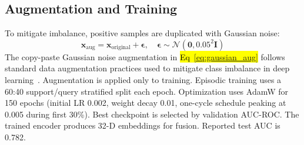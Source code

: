 \documentclass[10pt,letterpaper]{article}
\begin{document}
                                                                                                                  \subsection*{Augmentation and Training}
                                                                                                                  To mitigate imbalance, positive samples are duplicated with Gaussian noise:
                                                                                                                  \begin{equation}
                                                                                                                  \label{eq:gaussian_aug}
                                                                                                                  \mathbf{x}_{\text{aug}} = \mathbf{x}_{\text{original}} + \boldsymbol{\epsilon},\quad
                                                                                                                  \boldsymbol{\epsilon}\sim \mathcal{N}(\mathbf{0},0.05^2\mathbf{I})
                                                                                                                  \end{equation}
                                                                                                                  The copy-paste Gaussian noise augmentation in \hl{Eq~\ref{eq:gaussian_aug}} follows standard data augmentation practices used to mitigate class imbalance in deep learning~\cite{ref56}. Augmentation is applied only to training. Episodic training uses a 60:40 support/query stratified split each epoch. Optimization uses AdamW for 150 epochs (initial LR 0.002, weight decay 0.01, one-cycle schedule peaking at 0.005 during first 30\%). Best checkpoint is selected by validation AUC-ROC. The trained encoder produces 32-D embeddings for fusion. Reported test AUC is 0.782.
\end{document}
